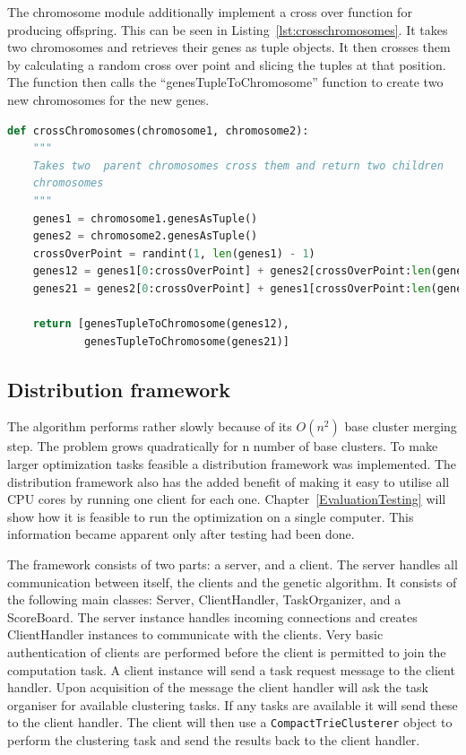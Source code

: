 The chromosome module additionally implement a cross over function for producing offspring. This can be seen in Listing~\ref{lst:crosschromosomes}. It takes two chromosomes and retrieves their genes as tuple objects. It then crosses them by calculating a random cross over point and slicing the tuples at that position. The function then calls the ``genesTupleToChromosome'' function to create two new chromosomes for the new genes.

\begin{lstlisting}[float=ht, language=python, breaklines=true, label=lst:crosschromosomes, caption={Code for crossing chromosomes}]
def crossChromosomes(chromosome1, chromosome2):
    """
    Takes two  parent chromosomes cross them and return two children
    chromosomes
    """
    genes1 = chromosome1.genesAsTuple()
    genes2 = chromosome2.genesAsTuple()
    crossOverPoint = randint(1, len(genes1) - 1)
    genes12 = genes1[0:crossOverPoint] + genes2[crossOverPoint:len(genes2)]
    genes21 = genes2[0:crossOverPoint] + genes1[crossOverPoint:len(genes1)]

    return [genesTupleToChromosome(genes12),
            genesTupleToChromosome(genes21)]
\end{lstlisting}

\subsection{Distribution framework}
The \CTC algorithm performs rather slowly because of its \(O(n^2)\) base cluster merging step. The problem grows quadratically for n number of base clusters. To make larger optimization tasks feasible a distribution framework was implemented. The distribution framework also has the added benefit of making it easy to utilise all CPU cores by running one client for each one. Chapter~\ref{EvaluationTesting} will show how it is feasible to run the optimization on a single computer. This information became apparent only after testing had been done.

The framework consists of two parts: a server, and a client. The server handles all communication between itself, the clients and the genetic algorithm. It consists of the following main classes: Server, ClientHandler, TaskOrganizer, and a ScoreBoard. The server instance handles incoming connections and creates ClientHandler instances to communicate with the clients. Very basic authentication of clients are performed before the client is permitted to join the computation task. A client instance will send a task request message to the client handler. Upon acquisition of the message the client handler will ask the task organiser for available clustering tasks. If any tasks are available it will send these to the client handler. The client will then use a \texttt{CompactTrieClusterer} object to perform the clustering task and send the results back to the client handler.

